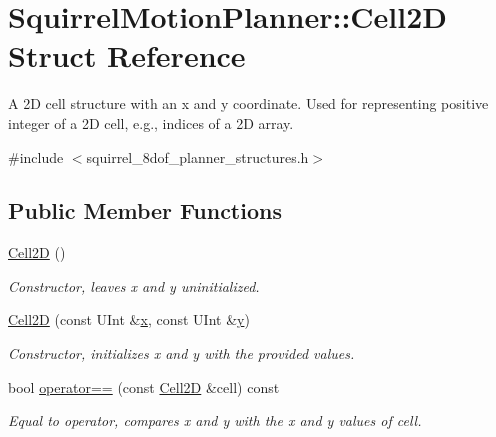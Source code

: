 \hypertarget{structSquirrelMotionPlanner_1_1Cell2D}{\section{Squirrel\-Motion\-Planner\-:\-:Cell2\-D Struct Reference}
\label{structSquirrelMotionPlanner_1_1Cell2D}
}


A 2\-D cell structure with an x and y coordinate. Used for representing positive integer of a 2\-D cell, e.\-g., indices of a 2\-D array.  




{\ttfamily \#include $<$squirrel\-\_\-8dof\-\_\-planner\-\_\-structures.\-h$>$}

\subsection*{Public Member Functions}
\begin{DoxyCompactItemize}
\item 
\hypertarget{structSquirrelMotionPlanner_1_1Cell2D_a4267891a403ad85184f66ef8cec4712a}{\hyperlink{structSquirrelMotionPlanner_1_1Cell2D_a4267891a403ad85184f66ef8cec4712a}{Cell2\-D} ()}\label{structSquirrelMotionPlanner_1_1Cell2D_a4267891a403ad85184f66ef8cec4712a}

\begin{DoxyCompactList}\small\item\em Constructor, leaves x and y uninitialized. \end{DoxyCompactList}\item 
\hypertarget{structSquirrelMotionPlanner_1_1Cell2D_af1bbddded4b55625fe0401d1124d05a2}{\hyperlink{structSquirrelMotionPlanner_1_1Cell2D_af1bbddded4b55625fe0401d1124d05a2}{Cell2\-D} (const U\-Int \&\hyperlink{structSquirrelMotionPlanner_1_1Cell2D_aef5765733cf272e9c894907643b758d5}{x}, const U\-Int \&\hyperlink{structSquirrelMotionPlanner_1_1Cell2D_a9deb157b1834298c719cb3eb77ff6e5e}{y})}\label{structSquirrelMotionPlanner_1_1Cell2D_af1bbddded4b55625fe0401d1124d05a2}

\begin{DoxyCompactList}\small\item\em Constructor, initializes x and y with the provided values. \end{DoxyCompactList}\item 
bool \hyperlink{structSquirrelMotionPlanner_1_1Cell2D_a23370d7434c584f4c4bbbd987aadd99b}{operator==} (const \hyperlink{structSquirrelMotionPlanner_1_1Cell2D}{Cell2\-D} \&cell) const 
\begin{DoxyCompactList}\small\item\em Equal to operator, compares x and y with the x and y values of cell. \end{DoxyCompactList}\end{DoxyCompactItemize}
